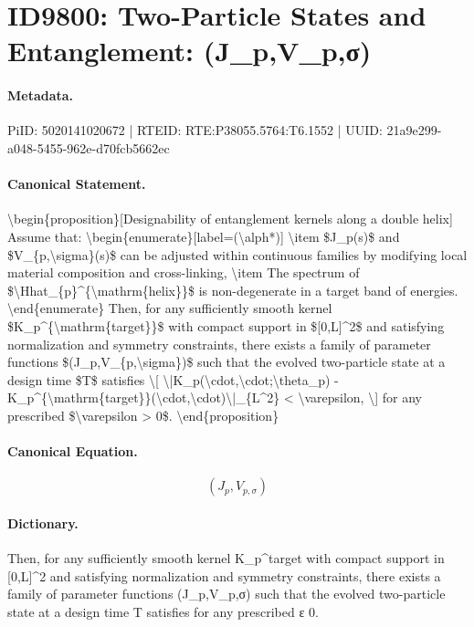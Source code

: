 \section*{ID9800: Two-Particle States and Entanglement: (J\_p,V\_p,σ)}
\paragraph{Metadata.}
PiID: 5020141020672 | RTEID: RTE:P38055.5764:T6.1552 | UUID: 21a9e299-a048-5455-962e-d70fcb5662ec

\paragraph{Canonical Statement.}
\textbackslash{}begin\{proposition\}[Designability of entanglement kernels along a double helix] Assume that: \textbackslash{}begin\{enumerate\}[label=(\textbackslash{}alph*)] \textbackslash{}item \$J\_p(s)\$ and \$V\_\{p,\textbackslash{}sigma\}(s)\$ can be adjusted within continuous families by modifying local material composition and cross-linking, \textbackslash{}item The spectrum of \$\textbackslash{}Hhat\_\{p\}\textasciicircum{}\{\textbackslash{}mathrm\{helix\}\}\$ is non-degenerate in a target band of energies. \textbackslash{}end\{enumerate\} Then, for any sufficiently smooth kernel \$K\_p\textasciicircum{}\{\textbackslash{}mathrm\{target\}\}\$ with compact support in \$[0,L]\textasciicircum{}2\$ and satisfying normalization and symmetry constraints, there exists a family of parameter functions \$(J\_p,V\_\{p,\textbackslash{}sigma\})\$ such that the evolved two-particle state at a design time \$T\$ satisfies \textbackslash{}[ \textbackslash{}|K\_p(\textbackslash{}cdot,\textbackslash{}cdot;\textbackslash{}theta\_p) - K\_p\textasciicircum{}\{\textbackslash{}mathrm\{target\}\}(\textbackslash{}cdot,\textbackslash{}cdot)\textbackslash{}|\_\{L\textasciicircum{}2\} < \textbackslash{}varepsilon, \textbackslash{}] for any prescribed \$\textbackslash{}varepsilon > 0\$. \textbackslash{}end\{proposition\}

\paragraph{Canonical Equation.}
\[
(J_p,V_{p,\sigma})
\]

\paragraph{Dictionary.}
Then, for any sufficiently smooth kernel K\_p\textasciicircum{}target with compact support in [0,L]\textasciicircum{}2 and satisfying normalization and symmetry constraints, there exists a family of parameter functions (J\_p,V\_p,σ) such that the evolved two-particle state at a design time T satisfies for any prescribed ε 0.

